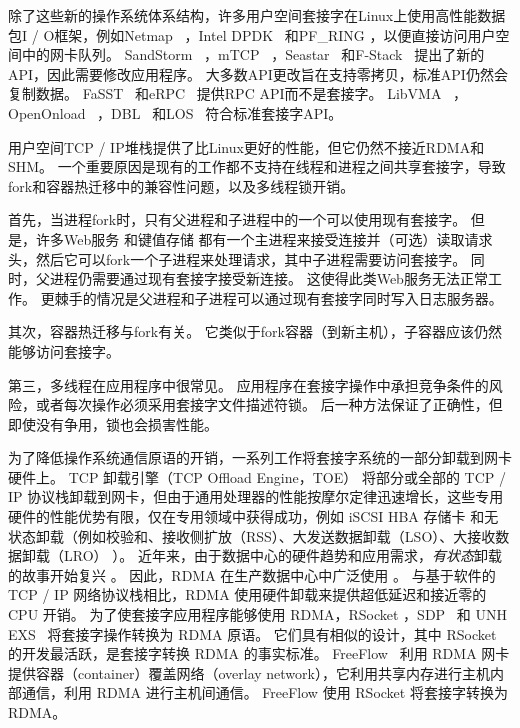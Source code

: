除了这些新的操作系统体系结构，许多用户空间套接字在Linux上使用高性能数据包I / O框架，例如Netmap~ \cite {rizzo2012netmap}，Intel DPDK~ \cite {dpdk}和PF\_RING \cite {pf-ring}，以便直接访问用户空间中的网卡队列。
SandStorm~ \cite {marinos2014network}，mTCP~ \cite {jeong2014mtcp}，Seastar~ \cite {seastar}和F-Stack~ \cite {fstack}提出了新的API，因此需要修改应用程序。
大多数API更改旨在支持零拷贝，标准API仍然会复制数据。
FaSST~ \cite {kalia2016fasst}和eRPC~ \cite {kalia2018datacenter}提供RPC API而不是套接字。
LibVMA~ \cite {libvma}，OpenOnload~ \cite {openonload}，DBL~ \cite {dbl}和LOS~ \cite {huang2017high}符合标准套接字API。

用户空间TCP / IP堆栈提供了比Linux更好的性能，但它仍然不接近RDMA和SHM。
一个重要原因是现有的工作都不支持在线程和进程之间共享套接字，导致fork和容器热迁移中的兼容性问题，以及多线程锁开销。

首先，当进程fork时，只有父进程和子进程中的一个可以使用现有套接字。
但是，许多Web服务 \cite {apache,nginx,php-fpm,python-gunicorn,vsftpd}和键值存储 \cite {memcached}都有一个主进程来接受连接并（可选）读取请求头，然后它可以fork一个子进程来处理请求，其中子进程需要访问套接字。
同时，父进程仍需要通过现有套接字接受新连接。
这使得此类Web服务无法正常工作。
更棘手的情况是父进程和子进程可以通过现有套接字同时写入日志服务器。

其次，容器热迁移与fork有关。
它类似于fork容器（到新主机），子容器应该仍然能够访问套接字。

第三，多线程在应用程序中很常见。
应用程序在套接字操作中承担竞争条件的风险，或者每次操作必须采用套接字文件描述符锁。
后一种方法保证了正确性，但即使没有争用，锁也会损害性能。

为了降低操作系统通信原语的开销，一系列工作将套接字系统的一部分卸载到网卡硬件上。
TCP 卸载引擎（TCP Offload Engine，TOE） \cite {tcp-chimney-offload} 将部分或全部的 TCP / IP 协议栈卸载到网卡，但由于通用处理器的性能按摩尔定律迅速增长，这些专用硬件的性能优势有限，仅在专用领域中获得成功，例如 iSCSI HBA 存储卡 \cite {iscsi-hba} 和无状态卸载（例如校验和、接收侧扩放（RSS）、大发送数据卸载（LSO）、大接收数据卸载（LRO） \cite {lsolro}）。
近年来，由于数据中心的硬件趋势和应用需求，\emph {有状态}卸载的故事开始复兴 \cite {chuanxiong-rdma-keynote}。
因此，RDMA \cite {infiniband2000infiniband} 在生产数据中心中广泛使用 \cite {guo2016rdma}。
与基于软件的 TCP / IP 网络协议栈相比，RDMA 使用硬件卸载来提供超低延迟和接近零的 CPU 开销。
为了使套接字应用程序能够使用 RDMA，RSocket \cite {rsockets}，SDP~ \cite {socketsdirect} 和 UNH EXS~ \cite {russell2008extended} 将套接字操作转换为 RDMA 原语。
它们具有相似的设计，其中 RSocket 的开发最活跃，是套接字转换 RDMA 的事实标准。
FreeFlow~ \cite {nsdi19freeflow} 利用 RDMA 网卡提供容器（container）覆盖网络（overlay network），它利用共享内存进行主机内部通信，利用 RDMA 进行主机间通信。
FreeFlow 使用 RSocket 将套接字转换为 RDMA。

